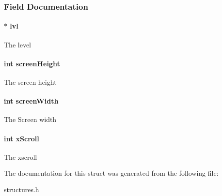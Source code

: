 \subsubsection{Field Documentation}
\hypertarget{struct_map_abca19b7de8e60347a507d1aeff95c764}{
\paragraph[{lvl}]{$\ast$ lvl}}\label{struct_map_abca19b7de8e60347a507d1aeff95c764}
The level \hypertarget{struct_map_a9ebc1dbd77788c4bfa27758a6725413f}{
\paragraph[{screen\-Height}]{\setlength{\rightskip}{0pt plus 5cm}int screen\-Height}}\label{struct_map_a9ebc1dbd77788c4bfa27758a6725413f}
The screen height \hypertarget{struct_map_ae50cb92a78d9e0a4f4bd718fc02bd294}{
\paragraph[{screen\-Width}]{\setlength{\rightskip}{0pt plus 5cm}int screen\-Width}}\label{struct_map_ae50cb92a78d9e0a4f4bd718fc02bd294}
The Screen width \hypertarget{struct_map_aa83bbdf2603e42824cd0bab44bf315c2}{
\paragraph[{x\-Scroll}]{\setlength{\rightskip}{0pt plus 5cm}int x\-Scroll}}\label{struct_map_aa83bbdf2603e42824cd0bab44bf315c2}
The xscroll 

The documentation for this struct was generated from the following file\-:\begin{DoxyCompactItemize}
\item 
structures.\-h\end{DoxyCompactItemize}
